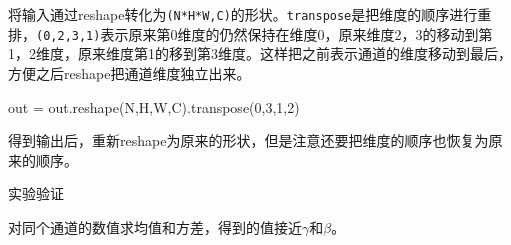 \documentclass[11pt]{article}
\newenvironment{Shaded}{}{}
\newcommand{\DecValTok}[1]{\textcolor[rgb]{0.25,0.63,0.44}{{#1}}}
\newcommand{\NormalTok}[1]{{#1}}
\newcommand{\OperatorTok}[1]{\textcolor[rgb]{0.40,0.40,0.40}{{#1}}}
\begin{document}
将输入通过reshape转化为\texttt{(N*H*W,C)}的形状。\texttt{transpose}是把维度的顺序进行重排，\texttt{(0,2,3,1)}表示原来第0维度的仍然保持在维度0，原来维度2，3的移动到第1，2维度，原来维度第1的移到第3维度。这样把之前表示通道的维度移动到最后，方便之后reshape把通道维度独立出来。

\begin{Shaded}
\begin{Highlighting}[]
\NormalTok{out }\OperatorTok{=}\NormalTok{ out.reshape(N,H,W,C).transpose(}\DecValTok{0}\NormalTok{,}\DecValTok{3}\NormalTok{,}\DecValTok{1}\NormalTok{,}\DecValTok{2}\NormalTok{)}
\end{Highlighting}
\end{Shaded}


得到输出后，重新reshape为原来的形状，但是注意还要把维度的顺序也恢复为原来的顺序。

实验验证

对同个通道的数值求均值和方差，得到的值接近\(\gamma\)和\(\beta\)。 
\end{document}
